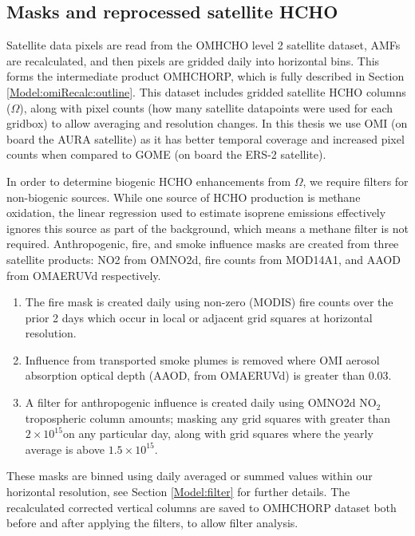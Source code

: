     
  
  \subsection{Masks and reprocessed satellite HCHO}
    
    Satellite data pixels are read from the OMHCHO level 2 satellite dataset, AMFs are recalculated, and then pixels are gridded daily into \highhr horizontal bins. 
    This forms the intermediate product OMHCHORP, which is fully described in Section \ref{Model:omiRecalc:outline}.
    This dataset includes gridded satellite HCHO columns ($\Omega$), along with pixel counts (how many satellite datapoints were used for each gridbox) to allow averaging and resolution changes.
    In this thesis we use OMI (on board the AURA satellite) as it has better temporal coverage and increased pixel counts when compared to GOME (on board the ERS-2 satellite).
    
    In order to determine biogenic HCHO enhancements from $\Omega$, we require filters for non-biogenic sources.
    While one source of HCHO production is methane oxidation, the linear regression used to estimate isoprene emissions effectively ignores this source as part of the background, which means a methane filter is not required.
    Anthropogenic, fire, and smoke influence masks are created from three satellite products: NO2 from OMNO2d, fire counts from MOD14A1, and AAOD from OMAERUVd respectively.
    \begin{enumerate}
      \item 
      The fire mask is created daily using non-zero (MODIS) fire counts over the prior 2 days which occur in local or adjacent grid squares at \highhr horizontal resolution.
      \item 
      Influence from transported smoke plumes is removed where OMI aerosol absorption optical depth (AAOD, from OMAERUVd) is greater than 0.03.
      \item 
      A filter for anthropogenic influence is created daily using OMNO2d NO$_2$ tropospheric column amounts; masking any grid squares with greater than $2\times 10^{15}$\moleccm on any particular day, along with grid squares where the yearly average is above $1.5 \times 10^{15}$\moleccm.
    \end{enumerate}
    These masks are binned using daily averaged or summed values within our \highhr horizontal resolution, see Section \ref{Model:filter} for further details.
    The recalculated corrected vertical columns are saved to OMHCHORP dataset both before and after applying the filters, to allow filter analysis.
    
